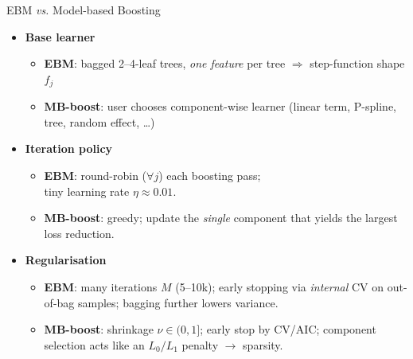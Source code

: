 \documentclass[10pt,compress,t,notes=noshow, xcolor=table]{beamer}
\begin{document}
\begin{frame}{EBM \textit{vs.} Model-based Boosting}
\small
\begin{itemize}
  \item \textbf{Base learner}
        \begin{itemize}
          \item \textbf{EBM}: bagged 2--4-leaf trees, \emph{one feature} per tree  
                $\Rightarrow$ step-function shape $f_j$  %
          \item \textbf{MB-boost}: user chooses component-wise learner  
                (linear term, P-spline, tree, random effect, \dots)  
        \end{itemize}
\pause
  \item \textbf{Iteration policy}
        \begin{itemize}
          \item \textbf{EBM}: round-robin ($\forall j$) each boosting pass; \\tiny
                learning rate $\eta \approx 0.01$.
          \item \textbf{MB-boost}: greedy; update the \emph{single} component that yields the largest loss reduction.
        \end{itemize}
\pause
  \item \textbf{Regularisation}
        \begin{itemize}
          \item \textbf{EBM}: many iterations $M$ (5--10k);  
                early stopping via \emph{internal} CV on out-of-bag samples;  
                bagging further lowers variance.
          \item \textbf{MB-boost}: shrinkage $\nu \in (0,1]$;  
                early stop by CV/AIC; component selection acts like an
                $L_0/L_1$ penalty $\rightarrow$ sparsity.
        \end{itemize}
\end{itemize}
\end{frame}
\end{document}
